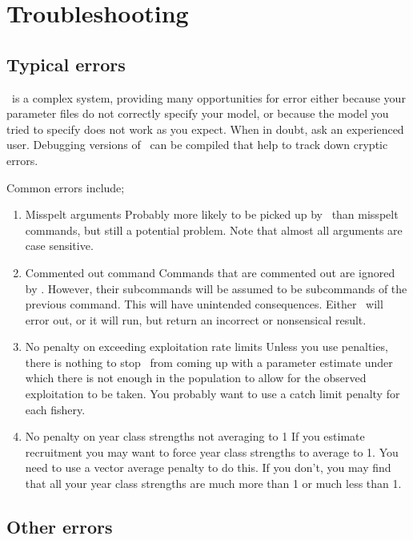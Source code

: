 \section{Troubleshooting\label{sec:trouble-shooting}}

\subsection{Typical errors\label{sec:typical-errors}}

\SPM\ is a complex system, providing many opportunities for error \textemdash either because your parameter files do not correctly specify your model, or because the model you tried to specify does not work as you expect. When in doubt, ask an experienced user. Debugging versions of \SPM\ can be compiled that help to track down cryptic errors.

Common errors include;
\begin{enumerate}
\item Misspelt arguments
Probably more likely to be picked up by \SPM\ than misspelt commands, but still a potential problem. Note that almost all arguments are case sensitive.

\item Commented out command
Commands that are commented out are ignored by \SPM. However, their subcommands will be assumed to be subcommands of the previous command. This will have unintended consequences. Either \SPM\ will error out, or it will run, but return an incorrect or nonsensical result. 

\item No penalty on exceeding exploitation rate limits
Unless you use penalties, there is nothing to stop \SPM\ from coming up with a parameter estimate under which there is not enough in the population to allow for the observed exploitation to be taken. You probably want to use a catch limit penalty for each fishery. 

\item No penalty on year class strengths not averaging to 1
If you estimate recruitment you may want to force year class strengths to average to 1. You need to use a vector average penalty to do this. If you don't, you may find that all your year class strengths are much more than 1 or much less than 1. 
\end{enumerate}

\subsection{Other errors}

